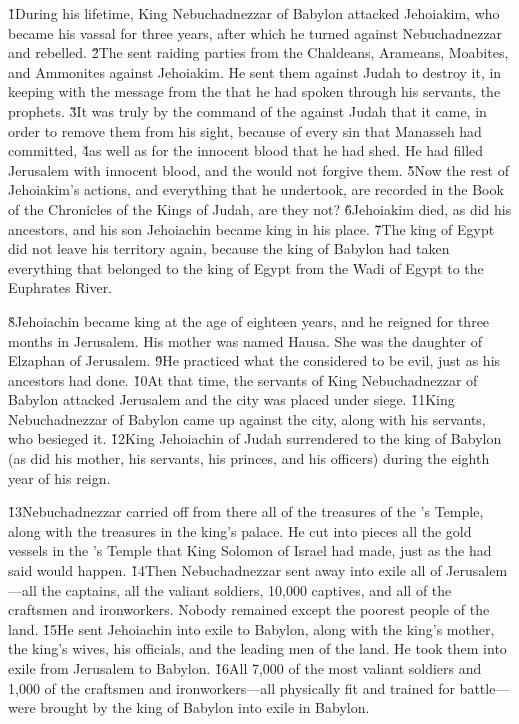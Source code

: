 \v{1}During his lifetime, King Nebuchadnezzar of Babylon attacked Jehoiakim, who became his vassal for three years, after which he turned against Nebuchadnezzar and rebelled. \v{2}The  sent raiding parties from the Chaldeans, Arameans, Moabites, and Ammonites against Jehoiakim. He sent them against Judah to destroy it, in keeping with the message from the  that he had spoken through his servants, the prophets. \v{3}It was truly by the command of the  against Judah that it came, in order to remove them from his sight, because of every sin that Manasseh had committed, \v{4}as well as for the innocent blood that he had shed. He had filled Jerusalem with innocent blood, and the  would not forgive them. \v{5}Now the rest of Jehoiakim's actions, and everything that he undertook, are recorded in the Book of the Chronicles of the Kings of Judah, are they not? \v{6}Jehoiakim died, as did his ancestors, and his son Jehoiachin became king in his place. \v{7}The king of Egypt did not leave his territory again, because the king of Babylon had taken everything that belonged to the king of Egypt from the Wadi of Egypt to the Euphrates River.

\v{8}Jehoiachin became king at the age of eighteen years, and he reigned for three months in Jerusalem. His mother was named Hausa. She was the daughter of Elzaphan of Jerusalem. \v{9}He practiced what the  considered to be evil, just as his ancestors had done. \v{10}At that time, the servants of King Nebuchadnezzar of Babylon attacked Jerusalem and the city was placed under siege. \v{11}King Nebuchadnezzar of Babylon came up against the city, along with his servants, who besieged it. \v{12}King Jehoiachin of Judah surrendered to the king of Babylon (as did his mother, his servants, his princes, and his officers) during the eighth year of his reign.

\v{13}Nebuchadnezzar carried off from there all of the treasures of the 's Temple, along with the treasures in the king's palace. He cut into pieces all the gold vessels in the 's Temple that King Solomon of Israel had made, just as the  had said would happen. \v{14}Then Nebuchadnezzar sent away into exile all of Jerusalem---all the captains, all the valiant soldiers, 10,000 captives, and all of the craftsmen and ironworkers. Nobody remained except the poorest people of the land. \v{15}He sent Jehoiachin into exile to Babylon, along with the king's mother, the king's wives, his officials, and the leading men of the land. He took them into exile from Jerusalem to Babylon. \v{16}All 7,000 of the most valiant soldiers and 1,000 of the craftsmen and ironworkers---all physically fit and trained for battle---were brought by the king of Babylon into exile in Babylon.

